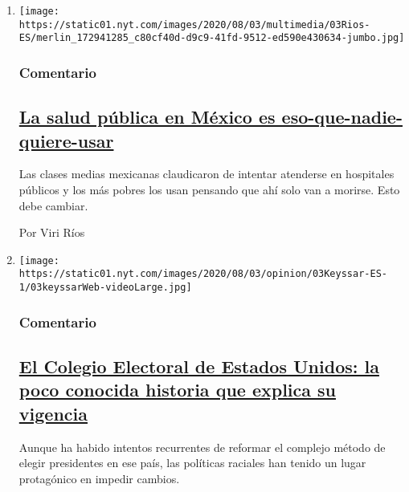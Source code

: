 \begin{enumerate}
\def\labelenumi{\arabic{enumi}.}
\item
  \texttt{[image: https://static01.nyt.com/images/2020/08/03/multimedia/03Rios-ES/merlin\_172941285\_c80cf40d-d9c9-41fd-9512-ed590e430634-jumbo.jpg]}

  \hypertarget{comentario}{%
  \subsubsection{Comentario}\label{comentario}}

  \hypertarget{la-salud-puxfablica-en-muxe9xico-es-eso-que-nadie-quiere-usar}{%
  \subsection{\texorpdfstring{\href{/es/2020/08/03/espanol/opinion/servicio-salud-mexico.html}{La
  salud pública en México es
  eso-que-nadie-quiere-usar}}{La salud pública en México es eso-que-nadie-quiere-usar}}\label{la-salud-puxfablica-en-muxe9xico-es-eso-que-nadie-quiere-usar}}

  Las clases medias mexicanas claudicaron de intentar atenderse en
  hospitales públicos y los más pobres los usan pensando que ahí solo
  van a morirse. Esto debe cambiar.

  Por Viri Ríos
\item
  \texttt{[image: https://static01.nyt.com/images/2020/08/03/opinion/03Keyssar-ES-1/03keyssarWeb-videoLarge.jpg]}

  \hypertarget{comentario-1}{%
  \subsubsection{Comentario}\label{comentario-1}}

  \hypertarget{el-colegio-electoral-de-estados-unidos-la-poco-conocida-historia-que-explica-su-vigencia}{%
  \subsection{\texorpdfstring{\href{/es/2020/08/03/espanol/opinion/colegio-electoral-estados-unidos.html}{El
  Colegio Electoral de Estados Unidos: la poco conocida historia que
  explica su
  vigencia}}{El Colegio Electoral de Estados Unidos: la poco conocida historia que explica su vigencia}}\label{el-colegio-electoral-de-estados-unidos-la-poco-conocida-historia-que-explica-su-vigencia}}

  Aunque ha habido intentos recurrentes de reformar el complejo método
  de elegir presidentes en ese país, las políticas raciales han tenido
  un lugar protagónico en impedir cambios.


\end{enumerate}
